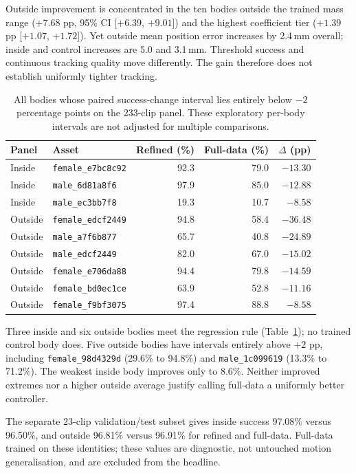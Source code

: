 \documentclass[11pt]{article}
\begin{document}
Outside improvement is concentrated in the ten bodies outside the trained
mass range ($+7.68$ pp, 95\% CI [$+6.39$, $+9.01$]) and the highest
coefficient tier ($+1.39$ pp [$+1.07$, $+1.72$]). Yet outside mean position
error increases by 2.4\,mm overall; inside and control increases are 5.0 and
3.1\,mm. Threshold success and continuous tracking quality move differently.
The gain therefore does not establish uniformly tighter tracking.

\begin{table}[t]
\centering\small
\caption{All bodies whose paired success-change interval lies entirely below
$-2$ percentage points on the 233-clip panel. These exploratory per-body
intervals are not adjusted for multiple comparisons.}\label{tab:unseen_v2_regressions}
\begin{tabular}{llrrr}
\toprule
Panel & Asset & Refined (\%) & Full-data (\%) & $\Delta$ (pp) \\
\midrule
Inside & \texttt{female\_e7bc8c92} & 92.3 & 79.0 & $-13.30$ \\
Inside & \texttt{male\_6d81a8f6} & 97.9 & 85.0 & $-12.88$ \\
Inside & \texttt{male\_ec3bb7f8} & 19.3 & 10.7 & $-8.58$ \\
Outside & \texttt{female\_edcf2449} & 94.8 & 58.4 & $-36.48$ \\
Outside & \texttt{male\_a7f6b877} & 65.7 & 40.8 & $-24.89$ \\
Outside & \texttt{male\_edcf2449} & 82.0 & 67.0 & $-15.02$ \\
Outside & \texttt{female\_e706da88} & 94.4 & 79.8 & $-14.59$ \\
Outside & \texttt{female\_bd0ec1ce} & 63.9 & 52.8 & $-11.16$ \\
Outside & \texttt{female\_f9bf3075} & 97.4 & 88.8 & $-8.58$ \\
\bottomrule
\end{tabular}
\end{table}
Three inside and six outside bodies meet the regression rule
(Table~\ref{tab:unseen_v2_regressions}); no trained control body does.
Five outside bodies have intervals entirely above $+2$ pp, including
\texttt{female\_98d4329d} (29.6\% to 94.8\%) and
\texttt{male\_1c099619} (13.3\% to 71.2\%). The weakest inside body improves
only to 8.6\%. Neither improved extremes nor a higher outside average
justify calling full-data a uniformly better controller.

The separate 23-clip validation/test subset gives inside success
97.08\% versus 96.50\%, and outside 96.81\% versus 96.91\% for refined and
full-data. Full-data trained on these identities; these values are diagnostic,
not untouched motion generalisation, and are excluded from the headline.
\end{document}
